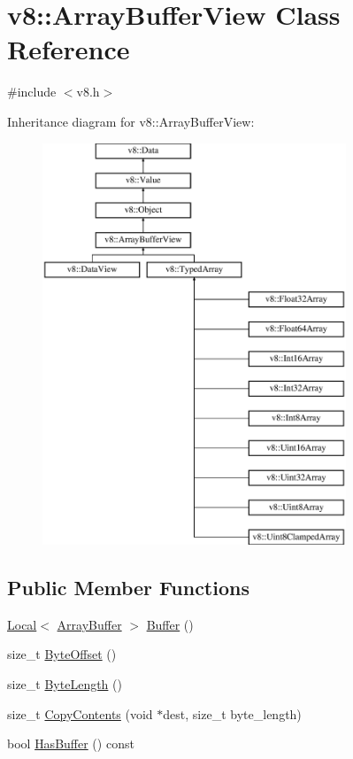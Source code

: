 \hypertarget{classv8_1_1_array_buffer_view}{}\section{v8\+:\+:Array\+Buffer\+View Class Reference}
\label{classv8_1_1_array_buffer_view}


{\ttfamily \#include $<$v8.\+h$>$}

Inheritance diagram for v8\+:\+:Array\+Buffer\+View\+:\begin{figure}[H]
\begin{center}
\leavevmode
\includegraphics[height=12.000000cm]{classv8_1_1_array_buffer_view}
\end{center}
\end{figure}
\subsection*{Public Member Functions}
\begin{DoxyCompactItemize}
\item 
\hyperlink{classv8_1_1_local}{Local}$<$ \hyperlink{classv8_1_1_array_buffer}{Array\+Buffer} $>$ \hyperlink{classv8_1_1_array_buffer_view_a2ceba3908fbf98ecc81702083127b046}{Buffer} ()
\item 
size\+\_\+t \hyperlink{classv8_1_1_array_buffer_view_a4739a31269f5ebc5b88a708b9429c688}{Byte\+Offset} ()
\item 
size\+\_\+t \hyperlink{classv8_1_1_array_buffer_view_a9fc7563c97e0b639a6c0a3274995bb3c}{Byte\+Length} ()
\item 
size\+\_\+t \hyperlink{classv8_1_1_array_buffer_view_aa728e762ed43194f3a5e05e792fff64e}{Copy\+Contents} (void $\ast$dest, size\+\_\+t byte\+\_\+length)
\item 
bool \hyperlink{classv8_1_1_array_buffer_view_ab3a7de283cab4140632d190a1e3eef22}{Has\+Buffer} () const 
\end{DoxyCompactItemize}
